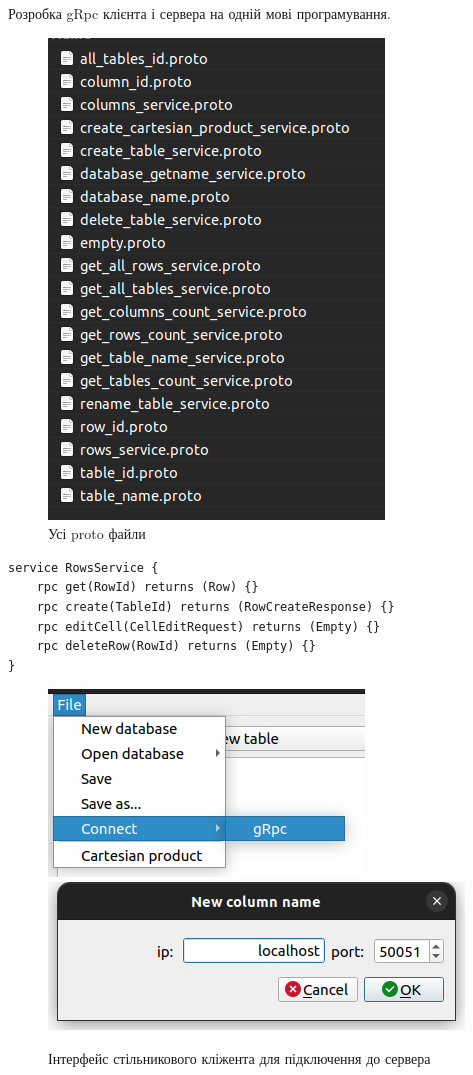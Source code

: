 \documentclass[a4paper, 12pt]{article}
\begin{document}
Розробка gRpc клієнта і сервера на одній мові програмування.

\begin{figure}[H]
\centering
\includegraphics[scale=0.3]{resources/ProtoFiles.png}
\caption{Усі proto файли}
\end{figure}

\begin{lstlisting}[caption=код gRpc сервіса для отриманя рядка таблиці]
service RowsService {
    rpc get(RowId) returns (Row) {}
    rpc create(TableId) returns (RowCreateResponse) {}
    rpc editCell(CellEditRequest) returns (Empty) {}
    rpc deleteRow(RowId) returns (Empty) {}
}
\end{lstlisting}

\begin{figure}[H]
\centering
\includegraphics[scale=0.5]{resources/gRpcClientMenu.png}
\includegraphics[scale=0.5]{resources/gRpcClientDialog.png}
\caption{Інтерфейс стільникового кліжента для підключення до сервера}
\end{figure}
\end{document}
